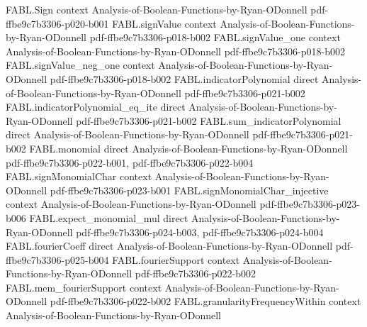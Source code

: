 \begin{theorem}
\label{FABL.noiseStability_eq_sum_rho_pow_mul_sq_fourierCoeff}
\leanok
{}
\proofstep
  {FABL.Sign}
  {context}
  {Analysis-of-Boolean-Functions-by-Ryan-ODonnell}
  {pdf-ffbe9c7b3306-p020-b001}
\proofstep
  {FABL.signValue}
  {context}
  {Analysis-of-Boolean-Functions-by-Ryan-ODonnell}
  {pdf-ffbe9c7b3306-p018-b002}
\proofstep
  {FABL.signValue_one}
  {context}
  {Analysis-of-Boolean-Functions-by-Ryan-ODonnell}
  {pdf-ffbe9c7b3306-p018-b002}
\proofstep
  {FABL.signValue_neg_one}
  {context}
  {Analysis-of-Boolean-Functions-by-Ryan-ODonnell}
  {pdf-ffbe9c7b3306-p018-b002}
\proofstep
  {FABL.indicatorPolynomial}
  {direct}
  {Analysis-of-Boolean-Functions-by-Ryan-ODonnell}
  {pdf-ffbe9c7b3306-p021-b002}
\proofstep
  {FABL.indicatorPolynomial_eq_ite}
  {direct}
  {Analysis-of-Boolean-Functions-by-Ryan-ODonnell}
  {pdf-ffbe9c7b3306-p021-b002}
\proofstep
  {FABL.sum_indicatorPolynomial}
  {direct}
  {Analysis-of-Boolean-Functions-by-Ryan-ODonnell}
  {pdf-ffbe9c7b3306-p021-b002}
\proofstep
  {FABL.monomial}
  {direct}
  {Analysis-of-Boolean-Functions-by-Ryan-ODonnell}
  {pdf-ffbe9c7b3306-p022-b001,
    pdf-ffbe9c7b3306-p022-b004}
\proofstep
  {FABL.signMonomialChar}
  {context}
  {Analysis-of-Boolean-Functions-by-Ryan-ODonnell}
  {pdf-ffbe9c7b3306-p023-b001}
\proofstep
  {FABL.signMonomialChar_injective}
  {context}
  {Analysis-of-Boolean-Functions-by-Ryan-ODonnell}
  {pdf-ffbe9c7b3306-p023-b006}
\proofstep
  {FABL.expect_monomial_mul}
  {direct}
  {Analysis-of-Boolean-Functions-by-Ryan-ODonnell}
  {pdf-ffbe9c7b3306-p024-b003,
    pdf-ffbe9c7b3306-p024-b004}
\proofstep
  {FABL.fourierCoeff}
  {direct}
  {Analysis-of-Boolean-Functions-by-Ryan-ODonnell}
  {pdf-ffbe9c7b3306-p025-b004}
\proofstep
  {FABL.fourierSupport}
  {context}
  {Analysis-of-Boolean-Functions-by-Ryan-ODonnell}
  {pdf-ffbe9c7b3306-p022-b002}
\proofstep
  {FABL.mem_fourierSupport}
  {context}
  {Analysis-of-Boolean-Functions-by-Ryan-ODonnell}
  {pdf-ffbe9c7b3306-p022-b002}
\proofstep
  {FABL.granularityFrequencyWithin}
  {context}
  {Analysis-of-Boolean-Functions-by-Ryan-ODonnell}

\end{theorem}
